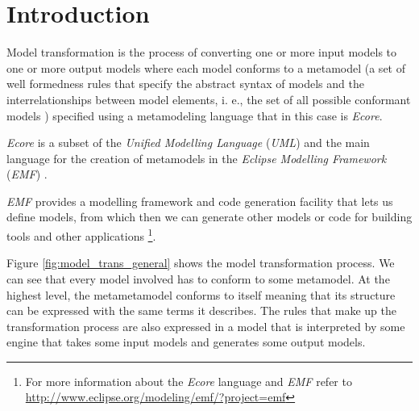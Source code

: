 \section{Introduction}
\label{sec:intro}

Model transformation is the process of converting one or more input models to
one or more output models \cite{model_transformations} where each model
conforms to a metamodel (a set of well formedness rules that specify the abstract
syntax of models and the interrelationships between model elements, i. e., the
set of all possible conformant models \cite{unification_models}) specified using
a metamodeling language that in this case is \emph{Ecore}.

\emph{Ecore} is a subset of the \emph{Unified Modelling Language} (\emph{UML})
and the main language for the creation of metamodels in the \emph{Eclipse
Modelling Framework} (\emph{EMF}) \cite{emf_book}.

\emph{EMF} provides a modelling framework and code generation facility that lets us
define models, from which then we can generate other models or code for building
tools and other applications \cite{emf_book} \footnote{For more
information about the \emph{Ecore} language and \emph{EMF} refer to
\url{http://www.eclipse.org/modeling/emf/?project=emf}}.

Figure \ref{fig:model_trans_general} shows the model transformation process. We
can see that every model involved has to conform to some metamodel. At the
highest level, the metametamodel conforms to itself meaning that its structure
can be expressed with the same terms it describes. The rules that make
up the transformation process are also expressed in a model that is interpreted
by some engine that takes some input models and generates some output
models.

